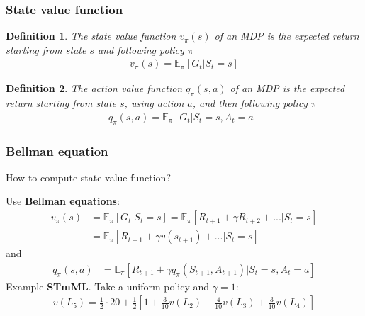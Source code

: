 \documentclass{beamer}
\newtheorem{defn}{Definition}
\begin{document}
\begin{frame}
\frametitle{State value function}
\begin{defn}
	The state value function $v_\pi(s)$ of an MDP is the expected return starting from state $s$ and following policy $\pi$
	\begin{align}
		v_\pi(s) = \mathbb{E}_\pi[G_t | S_t = s]
	\end{align}
\end{defn}
\pause
\begin{defn}
	The action value function $q_\pi(s, a)$ of an MDP is the expected return starting from state $s$, using action $a$, and then following policy $\pi$
	\begin{align}
	q_\pi(s,a) = \mathbb{E}_\pi[G_t | S_t = s, A_t = a]
	\end{align}
\end{defn}
\end{frame}

\begin{frame}
\frametitle{Bellman equation}
How to compute state value function?

Use \textbf{Bellman equations}:
\begin{align}
v_\pi(s) & = \mathbb{E}_\pi[G_t | S_t = s] = \mathbb{E}_\pi[R_{t+1} + \gamma R_{t+2} + ... | S_t = s] \nonumber \\
& = \mathbb{E}_\pi[R_{t+1} + \gamma v(s_{t+1}) + ... | S_t = s] 
\end{align}
and 
\begin{align}
q_\pi(s,a) & = \mathbb{E}_\pi[R_{t+1} + \gamma q_\pi (S_{t+1}, A_{t+1}) | S_t = s, A_t = a] 
\end{align}
\pause
Example \textbf{STmML}. Take a uniform policy and $\gamma = 1$:
\begin{align}
	v(L_5) = \frac{1}{2} \cdot 20 + \frac{1}{2} \left[1 + \frac{3}{10} v(L_2) + \frac{4}{10} v(L_3) + \frac{3}{10} v(L_4) \right]
\end{align}
\end{frame}
\end{document}
